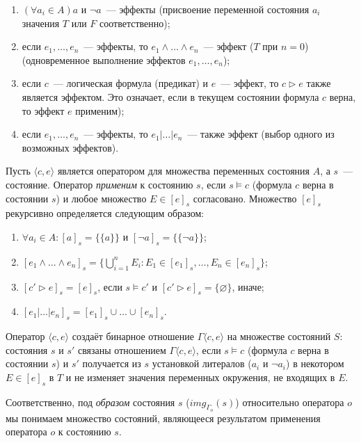 \begin{enumerate}
 \item $(\forall a_i \in A) a$ и $\neg a$~--- эффекты (присвоение переменной состояния $a_i$ значения $T$ или $F$ соответственно);
 \item если $e_1, \ldots, e_n$~--- эффекты, то $e_1 \wedge \ldots \wedge e_n$~--- эффект  ($T$ при $n = 0$) (одновременное выполнение эффектов $e_1, \ldots, e_n$);
 \item если $c$~--- логическая формула (предикат) и $e$~--- эффект, то $c \triangleright e$ также является эффектом. Это означает, если в текущем состоянии формула $c$ верна, то эффект $e$ применим);
 \item если $e_1, \ldots, e_n$~--- эффекты, то $e_1 | \ldots | e_n$~--- также эффект (выбор одного из возможных эффектов).
\end{enumerate}

Пусть $\langle c, e \rangle$ является оператором для множества переменных состояния $A$, а $s$~--- состояние. Оператор \textit{применим} к состоянию $s$, если $s \vDash c$ (формула $c$ верна в состоянии $s$) и любое множество $E \in [e]_s$ согласовано. Множество $[e]_s$ рекурсивно определяется следующим образом:

\begin{enumerate}
 \item $\forall a_i \in A: [a]_s = \{ \{ a \} \}$ и $[\neg a]_s = \{ \{\neg a \} \}$;
 \item $[e_1 \wedge \ldots \wedge e_n]_s = \{\bigcup_{i=1}^n E_i: E_1 \in [e_1]_s, \ldots, E_n \in [e_n]_s \}$;
 \item $[c' \triangleright e]_s = [e]_s$, если  $s \vDash c'$ и $[c' \triangleright e]_s = \{ \varnothing \}$, иначе;
 \item $[e_1 | \ldots | e_n]_s = [e_1]_s \cup \ldots \cup [e_n]_s$.
\end{enumerate}


Оператор $\langle c, e \rangle$ создаёт бинарное отношение $\Gamma \langle c, e \rangle$ на множестве состояний $S$: состояния $s$ и $s'$ связаны отношением $\Gamma \langle c, e \rangle$, если $s \vDash c$ (формула $c$ верна в состоянии $s$) и $s'$ получается из $s$ установкой литералов ($a_i$ и $\neg a_i$) в некотором $E \in [e]_s$ в $T$ и не изменяет значения переменных окружения, не входящих в $E$.

Соответственно, под \textit{образом} состояния $s$ ($img_{\Gamma_o}(s)$) относительно оператора $o$ мы понимаем множество состояний, являющееся результатом применения оператора $o$ к состоянию $s$.

